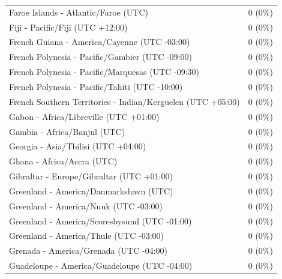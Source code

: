 \documentclass[
  english,
  man]{apa6}
\begin{document}
\begin{appendix}
\begin{table}
{\begin{tabular}[t]{ll}
\addlinespace
\hspace{1em}Faroe Islands - Atlantic/Faroe (UTC) & 0 (0\%)\\
\hspace{1em}Fiji - Pacific/Fiji (UTC +12:00) & 0 (0\%)\\
\hspace{1em}French Guiana - America/Cayenne (UTC -03:00) & 0 (0\%)\\
\hspace{1em}French Polynesia - Pacific/Gambier (UTC -09:00) & 0 (0\%)\\
\hspace{1em}French Polynesia - Pacific/Marquesas (UTC -09:30) & 0 (0\%)\\
\addlinespace
\hspace{1em}French Polynesia - Pacific/Tahiti (UTC -10:00) & 0 (0\%)\\
\hspace{1em}French Southern Territories - Indian/Kerguelen (UTC +05:00) & 0 (0\%)\\
\hspace{1em}Gabon - Africa/Libreville (UTC +01:00) & 0 (0\%)\\
\hspace{1em}Gambia - Africa/Banjul (UTC) & 0 (0\%)\\
\hspace{1em}Georgia - Asia/Tbilisi (UTC +04:00) & 0 (0\%)\\
\addlinespace
\hspace{1em}Ghana - Africa/Accra (UTC) & 0 (0\%)\\
\hspace{1em}Gibraltar - Europe/Gibraltar (UTC +01:00) & 0 (0\%)\\
\hspace{1em}Greenland - America/Danmarkshavn (UTC) & 0 (0\%)\\
\hspace{1em}Greenland - America/Nuuk (UTC -03:00) & 0 (0\%)\\
\hspace{1em}Greenland - America/Scoresbysund (UTC -01:00) & 0 (0\%)\\
\addlinespace
\hspace{1em}Greenland - America/Thule (UTC -03:00) & 0 (0\%)\\
\hspace{1em}Grenada - America/Grenada (UTC -04:00) & 0 (0\%)\\
\hspace{1em}Guadeloupe - America/Guadeloupe (UTC -04:00) & 0 (0\%)\\

\end{tabular}}
\end{table}
\end{appendix}
\end{document}
